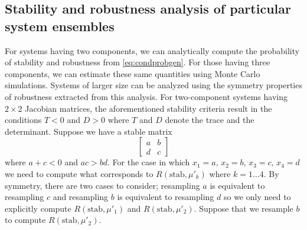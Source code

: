 \subsection{Stability and robustness analysis of particular system ensembles}
For systems having two components, we can analytically compute the probability of stability and robustness from \ref{eq:condprobgen}. For those having three components, we can estimate these same quantities using Monte Carlo simulations. Systems of larger size can be analyzed using the symmetry properties of robustness extracted from this analysis. For two-component systems having $2 \times 2$ Jacobian matrices, the aforementioned stability criteria result in the conditions $T < 0$ and $D >
0$ where $T$ and $D$ denote the trace and the determinant. Suppose we have a stable matrix
$$
\begin{bmatrix}
a & b \\
d & c
\end{bmatrix}
$$
where $a + c < 0$ and $ac > bd$.  For the case in which $x_1=a,\,x_2=b,\,x_3=c,\,x_4=d$ we need to compute what corresponds to $R(\mathrm{stab},\mu'_k)$ where $k=1 \ldots 4$. By symmetry, there are two cases to consider; resampling $a$ is equivalent to resampling $c$ and resampling $b$ is equivalent to resampling $d$ so we only need to explicitly compute $ R(\mathrm{stab},\mu'_1)$ and $R(\mathrm{stab},\mu'_2)$. Suppose that we resample $b$ to compute $R(\mathrm{stab},\mu'_2)$.
